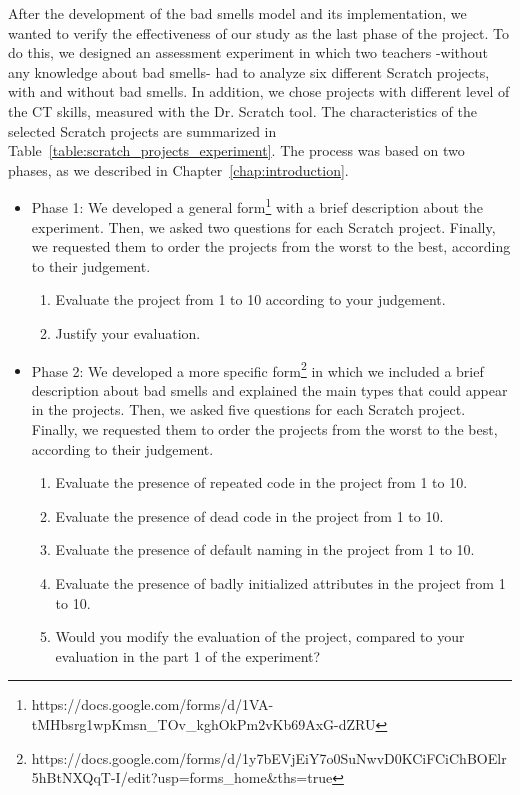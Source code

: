 After the development of the bad smells model and its implementation, we wanted to verify the effectiveness of our study as the last phase of the project. To do this, we designed an assessment experiment in which two teachers -without any knowledge about bad smells- had to analyze six different Scratch projects, with and without bad smells. In addition, we chose projects with different level of the CT skills, measured with the Dr. Scratch tool. The characteristics of the selected Scratch projects are summarized in Table~\ref{table:scratch_projects_experiment}. The process was based on two phases, as we described in Chapter~\ref{chap:introduction}.

\begin{itemize}
    \item Phase 1: We developed a general form\footnote{https://docs.google.com/forms/d/1VA-tMHbsrg1wpKmsn\_TOv\_kghOkPm2vKb69AxG-dZRU} with a brief description about the experiment. Then, we asked two questions for each Scratch project. Finally, we requested them to order the projects from the worst to the best, according to their judgement. 
    \begin{enumerate}
        \item Evaluate the project from 1 to 10 according to your judgement.
        \item Justify your evaluation.
    \end{enumerate}
    \item Phase 2: We developed a more specific form\footnote{https://docs.google.com/forms/d/1y7bEVjEiY7o0SuNwvD0KCiFCiChBOElr5hBtNXQqT-I/edit?usp=forms\_home\&ths=true} in which we included a brief description about bad smells and explained the main types that could appear in the projects. Then, we asked five questions for each Scratch project. Finally, we requested them to order the projects from the worst to the best, according to their judgement. 
    \begin{enumerate}
        \item Evaluate the presence of repeated code in the project from 1 to 10.
        \item Evaluate the presence of dead code in the project from 1 to 10.
        \item Evaluate the presence of default naming in the project from 1 to 10.
        \item Evaluate the presence of badly initialized attributes in the project from 1 to 10.
        \item Would you modify the evaluation of the project, compared to your evaluation in the part 1 of the experiment?
    \end{enumerate}
\end{itemize}

